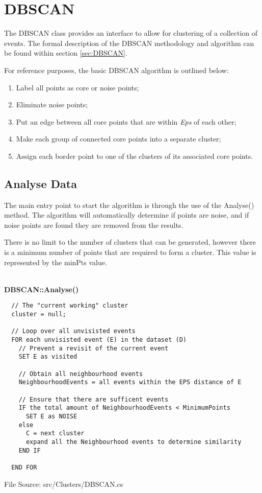 \section{DBSCAN}

The DBSCAN class provides an interface to allow for clustering of a collection 
of events. The formal description of the DBSCAN methodology and algorithm can 
be found within section \ref{sec:DBSCAN}.

For reference purposes, the basic DBSCAN algorithm is outlined below:
\begin{enumerate}
  \item Label all points as core or noise points;
  \item Eliminate noise points;
  \item Put an edge between all core points that are within {\em Eps} of each 
        other;
  \item Make each group of connected core points into a separate cluster;
  \item Assign each border point to one of the clusters of its associated core 
        points.
\end{enumerate}


\subsection{Analyse Data}
The main entry point to start the algorithm is through the use of the 
{\ttfamily Analyse()} method. The algorithm will automatically determine if 
points are noise, and if noise points are found they are removed from the 
results.

There is no limit to the number of clusters that can be generated, however 
there is a minimum number of points that are required to form a cluster. This 
value is represented by the minPts value.

~\\
{\bfseries DBSCAN::Analyse()}
\lstset{style=pseudocode}
\begin{lstlisting}
  // The "current working" cluster
  cluster = null;

  // Loop over all unvisisted events
  FOR each unvisisted event (E) in the dataset (D)
    // Prevent a revisit of the current event
    SET E as visited

    // Obtain all neighbourhood events 
    NeighbourhoodEvents = all events within the EPS distance of E

    // Ensure that there are sufficent events
    IF the total amount of NeighbourhoodEvents < MinimumPoints
      SET E as NOISE
    else
      C = next cluster
      expand all the Neighbourhood events to determine similarity
    END IF

  END FOR
\end{lstlisting}
{\textsf \footnotesize File Source: src/Clusters/DBSCAN.cs }


